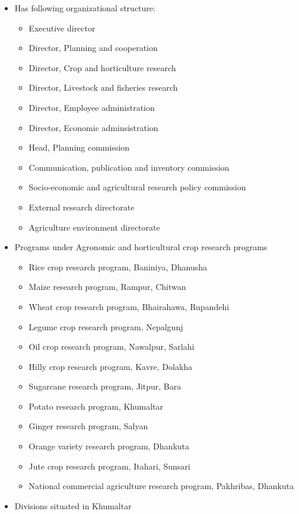 \documentclass[
  openany]{book}
\providecommand{\tightlist}{%
  \setlength{\itemsep}{0pt}\setlength{\parskip}{0pt}}
\begin{document}
\begin{itemize}
\tightlist
\item
  Has following organizational structure:

  \begin{itemize}
  \tightlist
  \item
    Executive director
  \item
    Director, Planning and cooperation
  \item
    Director, Crop and horticulture research
  \item
    Director, Livestock and fisheries research
  \item
    Director, Employee administration
  \item
    Director, Economic adminsistration
  \item
    Head, Planning commission
  \item
    Communication, publication and inventory commission
  \item
    Socio-economic and agricultural research policy commission
  \item
    External research directorate
  \item
    Agriculture environment directorate
  \end{itemize}
\item
  Programs under Agronomic and horticultural crop research programs

  \begin{itemize}
  \tightlist
  \item
    Rice crop research program, Baniniya, Dhanusha
  \item
    Maize research program, Rampur, Chitwan
  \item
    Wheat crop research program, Bhairahawa, Rupandehi
  \item
    Legume crop research program, Nepalgunj
  \item
    Oil crop research program, Nawalpur, Sarlahi
  \item
    Hilly crop research program, Kavre, Dolakha
  \item
    Sugarcane research program, Jitpur, Bara
  \item
    Potato research program, Khumaltar
  \item
    Ginger research program, Salyan
  \item
    Orange variety research program, Dhankuta
  \item
    Jute crop research program, Itahari, Sunsari
  \item
    National commercial agriculture research program, Pakhribas, Dhankuta
  \end{itemize}
\item
  Divisions situated in Khumaltar


\end{itemize}
\end{document}
